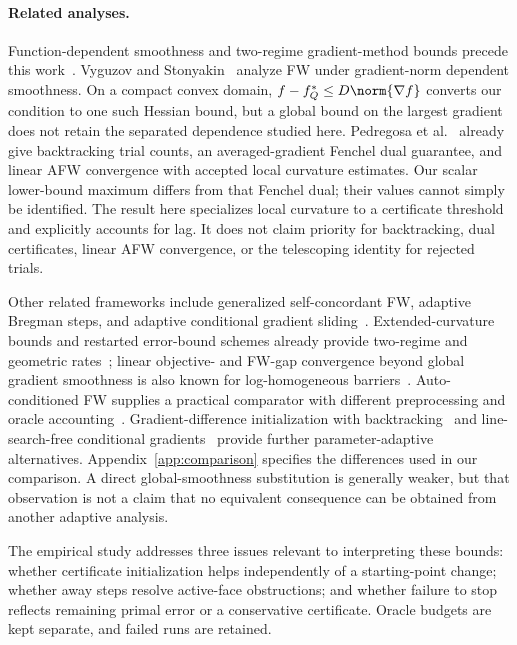 \paragraph{Related analyses.}
Function-dependent smoothness and two-regime gradient-method bounds
precede this work~\cite{warmup,lobanovkoloskova,lobanov}.
Vyguzov and Stonyakin~\cite{vyguzov} analyze FW under gradient-norm
dependent smoothness. On a compact convex domain,
$f-f_Q^*\le D\norm{\nabla f}$ converts our condition to one such Hessian
bound, but a global bound on the largest gradient does not retain the
separated dependence studied here.
Pedregosa et al.~\cite[Theorems 1, 3, and 4]{pedregosa} already give
backtracking trial counts, an averaged-gradient Fenchel dual guarantee,
and linear AFW convergence with accepted local curvature estimates.
Our scalar lower-bound maximum differs from that Fenchel dual; their
values cannot simply be identified. The result here specializes local
curvature to a certificate threshold and explicitly accounts for lag.
It does not claim priority for backtracking, dual certificates, linear
AFW convergence, or the telescoping identity for rejected trials.

Other related frameworks include generalized self-concordant FW,
adaptive Bregman steps, and adaptive conditional gradient
sliding~\cite{selfconcordant,bregmanfw,adcgs}.
Extended-curvature bounds and restarted error-bound schemes already
provide two-regime and geometric rates~\cite{wirth,restartfw};
linear objective- and FW-gap convergence beyond global gradient
smoothness is also known for log-homogeneous barriers~\cite{zhao}.
Auto-conditioned FW supplies a practical comparator with different
preprocessing and oracle accounting~\cite{autoconditioned}.
Gradient-difference initialization with backtracking~\cite{khademi}
and line-search-free conditional gradients~\cite{yagishita}
provide further parameter-adaptive alternatives.
Appendix~\ref{app:comparison} specifies the differences used in our
comparison. A direct global-smoothness substitution is generally weaker,
but that observation is not a claim that no equivalent consequence
can be obtained from another adaptive analysis.

The empirical study addresses three issues relevant to interpreting
these bounds: whether certificate initialization helps independently of
a starting-point change; whether away steps resolve active-face
obstructions; and whether failure to stop reflects remaining primal
error or a conservative certificate. Oracle budgets are kept separate,
and failed runs are retained.
